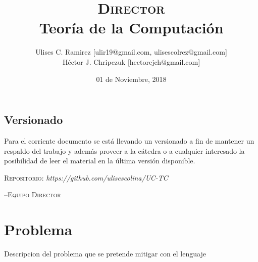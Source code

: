 \documentclass{report}
\title{\textsc{Director}\\Teoría de la Computación}
\author{Ulises C. Ramirez [ulir19@gmail.com, ulisescolrez@gmail.com]\\Héctor J.
Chripczuk [hectorejch@gmail.com]}
\date{01 de Noviembre, 2018}
\begin{document}
\maketitle
{}
\newpage
\section*{Versionado}
Para el corriente documento se est\'a llevando un versionado a fin de mantener
un respaldo del trabajo y adem\'as proveer a la c\'atedra o a cualquier
interesado la posibilidad de leer el material en la \'ultima versi\'on disponible.\\

\begin{center}
  \textsc{Repositorio}: \textit{https://github.com/ulisescolina/UC-TC}
\end{center}

\hfill--\textsc{Equipo Director}
\tableofcontents
{}
\newpage




\chapter{Problema}
\label{sec:problema}
Descripcion del problema que se pretende mitigar con el lenguaje



\newpage
\printbibliography[title={Referencias}]
\end{document}
